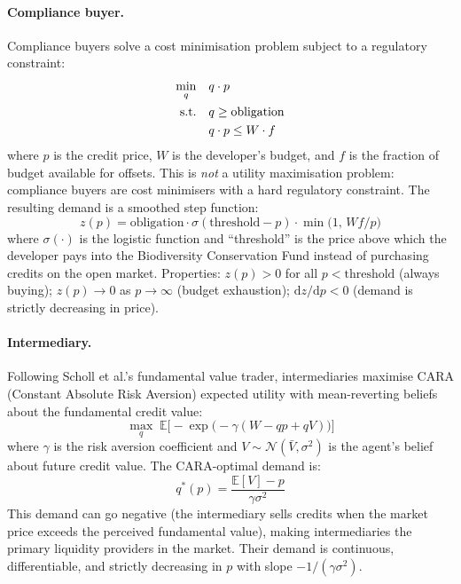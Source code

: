 \documentclass[pdflatex,sn-nature,oneside]{sn-jnl}
\begin{document}
\paragraph{Compliance buyer.}
Compliance buyers solve a cost minimisation problem subject to a regulatory constraint:
\begin{align}
    \min_{q} \quad & q \cdot p \notag \\
    \text{s.t.} \quad & q \geq \text{obligation} \notag \\
    & q \cdot p \leq W \cdot f \label{eq:compliance}
\end{align}
where $p$ is the credit price, $W$ is the developer's budget, and $f$ is the fraction of budget available for offsets. This is \emph{not} a utility maximisation problem: compliance buyers are cost minimisers with a hard regulatory constraint. The resulting demand is a smoothed step function:
\begin{equation}
    z(p) = \text{obligation} \cdot \sigma(\text{threshold} - p) \cdot \min\!\bigl(1,\, W f / p\bigr)
\end{equation}
where $\sigma(\cdot)$ is the logistic function and ``threshold'' is the price above which the developer pays into the Biodiversity Conservation Fund instead of purchasing credits on the open market. Properties: $z(p) > 0$ for all $p < \text{threshold}$ (always buying); $z(p) \to 0$ as $p \to \infty$ (budget exhaustion); $\mathrm{d}z/\mathrm{d}p < 0$ (demand is strictly decreasing in price).

\paragraph{Intermediary.}
Following Scholl et al.'s fundamental value trader, intermediaries maximise CARA (Constant Absolute Risk Aversion) expected utility with mean-reverting beliefs about the fundamental credit value:
\begin{equation}
    \max_{q} \; \mathbb{E}\bigl[-\exp\!\bigl(-\gamma(W - qp + qV)\bigr)\bigr]
\end{equation}
where $\gamma$ is the risk aversion coefficient and $V \sim \mathcal{N}(\bar{V}, \sigma^2)$ is the agent's belief about future credit value. The CARA-optimal demand is:
\begin{equation}
    q^{*}(p) = \frac{\mathbb{E}[V] - p}{\gamma \sigma^2}
\end{equation}
This demand can go negative (the intermediary sells credits when the market price exceeds the perceived fundamental value), making intermediaries the primary liquidity providers in the market. Their demand is continuous, differentiable, and strictly decreasing in $p$ with slope $-1/(\gamma\sigma^2)$.
\end{document}
